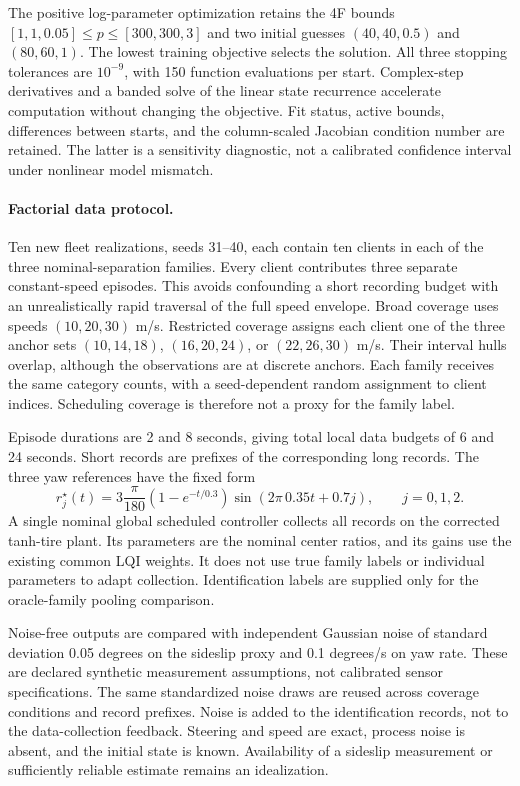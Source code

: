 The positive log-parameter optimization retains the 4F bounds
$[1,1,0.05]\leq p\leq[300,300,3]$ and two initial guesses
$(40,40,0.5)$ and $(80,60,1)$. The lowest training objective selects the solution.
All three stopping tolerances are $10^{-9}$, with 150 function evaluations per
start. Complex-step derivatives and a banded solve of the linear state
recurrence accelerate computation without changing the objective. Fit status,
active bounds, differences between starts, and the column-scaled Jacobian
condition number are retained. The latter is a sensitivity diagnostic, not a
calibrated confidence interval under nonlinear model mismatch.

\paragraph{Factorial data protocol.}
Ten new fleet realizations, seeds 31--40, each contain ten clients in each of
the three nominal-separation families. Every client contributes three separate
constant-speed episodes. This avoids confounding a short recording budget
with an unrealistically rapid traversal of the full speed envelope. Broad
coverage uses speeds $(10,20,30)$ m/s. Restricted coverage assigns each client
one of the three anchor sets $(10,14,18)$, $(16,20,24)$, or $(22,26,30)$ m/s.
Their interval hulls overlap, although the observations are at discrete anchors.
Each family receives the same category counts, with a seed-dependent random
assignment to client indices. Scheduling coverage is therefore not a proxy
for the family label.

Episode durations are 2 and 8 seconds, giving total local data budgets of
6 and 24 seconds. Short records are prefixes of the corresponding long records.
The three yaw references have the fixed form
\begin{equation}
 r_j^\star(t)=3\frac{\pi}{180}(1-e^{-t/0.3})
                 \sin(2\pi\,0.35t+0.7j),\qquad j=0,1,2.
\end{equation}
A single nominal global scheduled controller collects all records on the
corrected tanh-tire plant. Its parameters are the nominal center ratios, and
its gains use the existing common LQI weights. It does not use true family
labels or individual parameters to adapt collection. Identification labels
are supplied only for the oracle-family pooling comparison.

Noise-free outputs are compared with independent Gaussian noise of standard
deviation 0.05 degrees on the sideslip proxy and 0.1 degrees/s on yaw rate.
These are declared synthetic measurement assumptions, not calibrated sensor
specifications. The same standardized noise draws are reused across coverage
conditions and record prefixes. Noise is added to the identification records,
not to the data-collection feedback. Steering and speed are exact, process
noise is absent, and the initial state is known. Availability of a sideslip
measurement or sufficiently reliable estimate remains an idealization.

